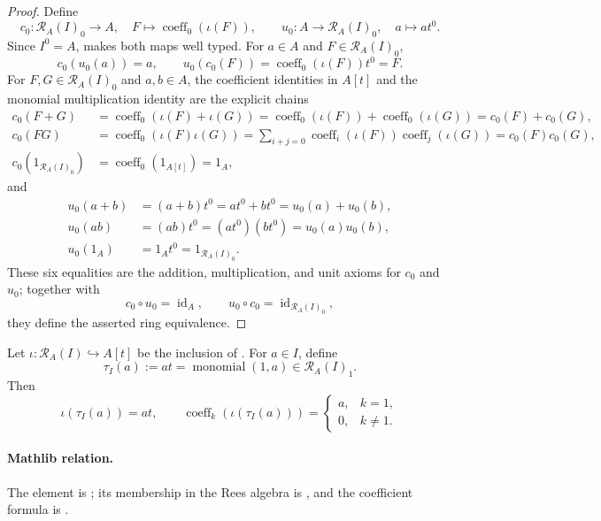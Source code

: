 \begin{proof}
  \leanok
  Define
  \[
    c_0\colon\mathcal R_A(I)_0\to A,
      \quad F\mapsto\operatorname{coeff}_0(\iota(F)),
    \qquad
    u_0\colon A\to\mathcal R_A(I)_0,
      \quad a\mapsto at^0.
  \]
  Since $I^0=A$,  makes both maps
  well typed.  For $a\in A$ and $F\in\mathcal R_A(I)_0$,
  \[
    c_0(u_0(a))=a,
    \qquad
    u_0(c_0(F))
      =\operatorname{coeff}_0(\iota(F))t^0=F.
  \]
  For $F,G\in\mathcal R_A(I)_0$ and $a,b\in A$, the coefficient identities
  in $A[t]$ and the monomial multiplication identity are the explicit chains
  \[
  \begin{aligned}
    c_0(F+G)
      &=\operatorname{coeff}_0(\iota(F)+\iota(G))
       =\operatorname{coeff}_0(\iota(F))
          +\operatorname{coeff}_0(\iota(G))
       =c_0(F)+c_0(G),\\
    c_0(FG)
      &=\operatorname{coeff}_0(\iota(F)\iota(G))
       =\sum_{i+j=0}\operatorname{coeff}_i(\iota(F))
          \operatorname{coeff}_j(\iota(G))
       =c_0(F)c_0(G),\\
    c_0(1_{\mathcal R_A(I)_0})
      &=\operatorname{coeff}_0(1_{A[t]})=1_A,
  \end{aligned}
  \]
  and
  \[
  \begin{aligned}
    u_0(a+b)&=(a+b)t^0=at^0+bt^0=u_0(a)+u_0(b),\\
    u_0(ab)&=(ab)t^0=(at^0)(bt^0)=u_0(a)u_0(b),\\
    u_0(1_A)&=1_At^0=1_{\mathcal R_A(I)_0}.
  \end{aligned}
  \]
  These six equalities are the addition, multiplication, and unit axioms for
  $c_0$ and $u_0$; together with
  \[
    c_0\circ u_0=\operatorname{id}_A,
    \qquad
    u_0\circ c_0=\operatorname{id}_{\mathcal R_A(I)_0},
  \]
  they define the asserted ring equivalence.
\end{proof}

\begin{lemma}
  \label{lemma:nagata-rees-degree-one-element}
  \leanok

  Let $\iota\colon\mathcal R_A(I)\hookrightarrow A[t]$ be the inclusion of
  .  For $a\in I$, define
  \[
    \tau_I(a):=at=\operatorname{monomial}(1,a)\in\mathcal R_A(I)_1.
  \]
  Then
  \[
    \iota(\tau_I(a))=at,
    \qquad
    \operatorname{coeff}_k(\iota(\tau_I(a)))
      =\begin{cases}a,&k=1,\\0,&k\ne1.
        \end{cases}
  \]

  \paragraph{Mathlib relation.}
  The element is \texttt{}; its membership
  in the Rees algebra is
  \texttt{}, and the coefficient
  formula is \texttt{}.
\end{lemma}

